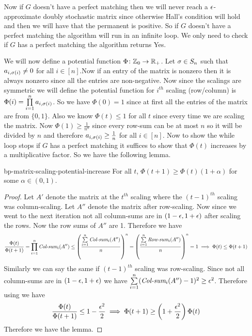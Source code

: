 Now if $G$ doesn't have a perfect matching then we will never reach a $\epsilon$-approximate doubly stochastic matrix since otherwise Hall's condition will hold and then we will have that the permanent is positive. So if $G$ doesn't have a perfect matching the algorithm will run in an infinite loop. We only need to check if $G$ has a perfect matching the algorithm returns Yes.

We will now define a potential function $\Phi\colon \mathbb{Z}_0\to \mathbb{R}_+$. Let $\sigma\in S_n$ such that $a_{i,\sigma(i)}\neq 0$ for all $i\in[n]$.Now if an entry of the matrix is nonzero then it is always nonzero since all the entries are non-negative. Now since the scalings are symmetric we will define the potential function for $i^{th}$ scaling (row/column) is $\Phi(i)=\prod\limits_{i=1}^n a_{i,\sigma(i)}$. So we have $\Phi(0)=1$ since at first all the entries of the matrix are from $\{0,1\}$. Also we know $\Phi(t)\leq 1$ for all $t$ since every time we are scaling the matrix. Now $\Phi(1)\geq \frac1{n^n}$ since every row-sum can be at most $n$ so it will be divided by $n$ and therefore $a_{i,\sigma(i)}\geq \frac1n$ for all $i\in[n]$. Now to show the while loop stops if $G$ has a perfect matching it suffices to show that $\Phi(t)$ increases by a multiplicative factor. So we have the following lemma.
\begin{lemma}{}{bp-matrix-scaling-potential-increase}
For all $t$, 	$\Phi(t+1)\geq \Phi(t)(1+\alpha)$ for some $\alpha\in (0,1)$. 
\end{lemma}
\begin{proof}
	Let $A'$ denote the matrix at the $t^{th}$ scaling where the $(t-1)^{th}$ scaling was column-scaling. Let $A''$ denote the matrix after row-scaling. Now since we went to the next iteration not all column-sums are in $(1-\epsilon, 1+\epsilon)$ after scaling the rows. Now the row sums of $A''$ are 1. Therefore we have $$\frac{\Phi(t)}{\Phi(t+1)}= \prod_{i=1}^n\textit{Col-sum}_i(A'')\leq \left(\frac{\sum\limits_{i=1}^n \textit{Col-sum}_i(A'')}n\right)^n=\left(\frac{\sum\limits_{i=1}^n \textit{Row-sum}_i(A'')}n\right)^n=1\implies \Phi(t)\leq \Phi(t+1)$$Similarly we can say the same if $(t-1)^{th}$ scaling was row-scaling. Since  not all column-sums are in $(1-\epsilon, 1+\epsilon)$ we have $\sum\limits_{i=1}^n(\textit{Col-sum}_i(A'')-1)^2\geq \epsilon^2$. Therefore using  we have $$\frac{\Phi(t)}{\Phi(t+1)}\leq 1-\frac{\epsilon^2}{2}\implies\Phi(t+1)\geq \left(1+\frac{\epsilon^2}2\right)\Phi(t)$$Therefore we have the lemma. 
\end{proof}

